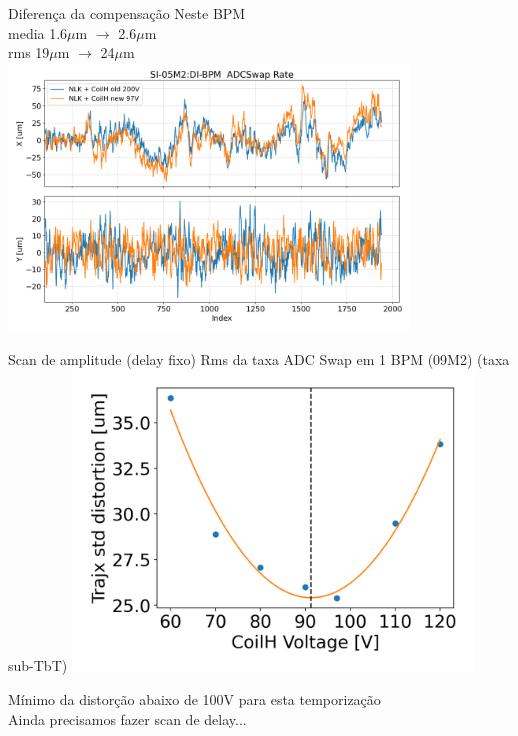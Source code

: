 \documentclass[1611]{beamer}					  %
\begin{document}
\begin{frame}{Diferença da compensação}
\centering
    Neste BPM \\
    media 1.6$\mu$m $\to$ 2.6$\mu$m\\
    rms 19$\mu$m $\to$ 24$\mu$m
    \includegraphics[width=0.8\textwidth]{2024-04-19/figures/nlk_and_coilh_old_new.png}
\end{frame}

\begin{frame}{Scan de amplitude (delay fixo)}
\centering
    Rms da taxa ADC Swap em 1 BPM (09M2) (taxa sub-TbT)
    \centering
    \includegraphics[width=0.8\textwidth]{2024-04-19/figures/voltage_scan_adcrate.png}

    Mínimo da distorção abaixo de 100V para esta temporização \\
    Ainda precisamos fazer scan de delay...
\end{frame}
\end{document}
